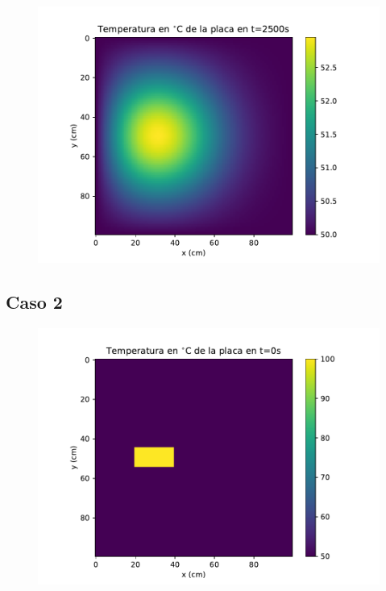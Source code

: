 \documentclass[12pt,letterpaper]{article}
\begin{document}
\begin{figure}[H]
\includegraphics{f1_2500.pdf}
\centering
\end{figure}

\subsection*{Caso 2}

\begin{figure}[H]
\includegraphics{f2_0.pdf}
\centering
\end{figure}
\end{document}
